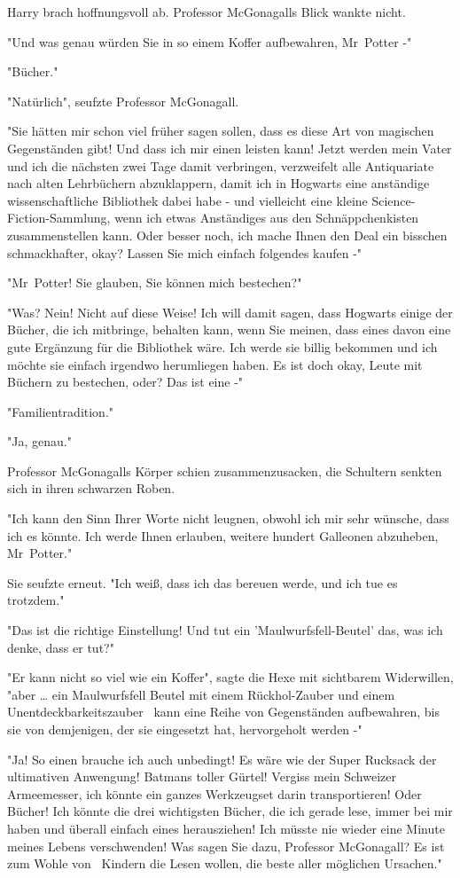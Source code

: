 {Harry brach hoffnungsvoll ab. Professor McGonagalls Blick wankte nicht.

"Und was genau würden Sie in so einem Koffer aufbewahren, Mr~Potter -"

"Bücher."

"Natürlich", seufzte Professor McGonagall.

"Sie hätten mir schon viel früher sagen sollen, dass es diese Art von magischen Gegenständen gibt! Und dass ich mir einen leisten kann! Jetzt werden mein Vater und ich die nächsten zwei Tage damit verbringen, verzweifelt alle Antiquariate nach alten Lehrbüchern abzuklappern, damit ich in Hogwarts eine anständige wissenschaftliche Bibliothek dabei habe - und vielleicht eine kleine Science-Fiction-Sammlung, wenn ich etwas Anständiges aus den Schnäppchenkisten zusammenstellen kann. Oder besser noch, ich mache Ihnen den Deal ein bisschen schmackhafter, okay? Lassen Sie mich einfach folgendes kaufen -"

"Mr~Potter! Sie glauben, Sie können mich bestechen?"

"Was? Nein! Nicht auf diese Weise! Ich will damit sagen, dass Hogwarts einige der Bücher, die ich mitbringe, behalten kann, wenn Sie meinen, dass eines davon eine gute Ergänzung für die Bibliothek wäre. Ich werde sie billig bekommen und ich möchte sie einfach irgendwo herumliegen haben. Es ist doch okay, Leute mit Büchern zu bestechen, oder? Das ist eine -"

"Familientradition."

"Ja, genau."

Professor McGonagalls Körper schien zusammenzusacken, die Schultern senkten sich in ihren schwarzen Roben.

"Ich kann den Sinn Ihrer Worte nicht leugnen, obwohl ich mir sehr wünsche, dass ich es könnte. Ich werde Ihnen erlauben, weitere hundert Galleonen abzuheben, Mr~Potter."

Sie seufzte erneut. "Ich weiß, dass ich das bereuen werde, und ich tue es trotzdem."

"Das ist die richtige Einstellung! Und tut ein 'Maulwurfsfell-Beutel' das, was ich denke, dass er tut?"

"Er kann nicht so viel wie ein Koffer", sagte die Hexe mit sichtbarem Widerwillen, "aber … ein Maulwurfsfell Beutel mit einem Rückhol-Zauber und einem Unentdeckbarkeitszauber ~kann eine Reihe von Gegenständen aufbewahren, bis sie von demjenigen, der sie eingesetzt hat, hervorgeholt werden -"

"Ja! So einen brauche ich auch unbedingt! Es wäre wie der Super Rucksack der ultimativen Anwengung! Batmans toller Gürtel! Vergiss mein Schweizer Armeemesser, ich könnte ein ganzes Werkzeugset darin transportieren! Oder Bücher! Ich könnte die drei wichtigsten Bücher, die ich gerade lese, immer bei mir haben und überall einfach eines herausziehen! Ich müsste nie wieder eine Minute meines Lebens verschwenden! Was sagen Sie dazu, Professor McGonagall? Es ist zum Wohle von ~Kindern die Lesen wollen, die beste aller möglichen Ursachen."

}
